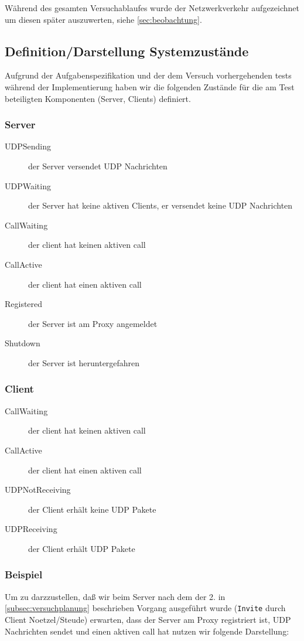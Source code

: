 \documentclass[10pt]{scrartcl}
\begin{document}
Während des gesamten Versuchablaufes wurde der Netzwerkverkehr aufgezeichnet um diesen später auszuwerten, siehe \ref{sec:beobachtung}.

\subsection{Definition/Darstellung Systemzustände}\label{subsec:systemzusatende}
Aufgrund der Aufgabenspezifikation und der dem Versuch vorhergehenden tests während der Implementierung haben wir die folgenden Zustände für die am Test beteiligten Komponenten (Server, Clients) definiert.


\subsubsection{Server}
	\begin{description}
		\item[UDPSending] der Server versendet UDP Nachrichten
		\item[UDPWaiting] der Server hat keine aktiven Clients, er versendet keine UDP Nachrichten
		\item[CallWaiting] der client hat keinen aktiven call
		\item[CallActive] der client hat einen aktiven call
		\item[Registered] der Server ist am Proxy angemeldet
		\item[Shutdown] der Server ist heruntergefahren
	\end{description}
	
\subsubsection{Client}	
	\begin{description}
		\item[CallWaiting] der client hat keinen aktiven call
		\item[CallActive] der client hat einen aktiven call
		\item[UDPNotReceiving] der Client erhält keine UDP Pakete
		\item[UDPReceiving] der Client erhält UDP Pakete
	\end{description}	
	

	

\subsubsection{Beispiel}
Um zu darzzustellen, daß wir beim Server nach dem der 2. in \ref{subsec:versuchplanung} beschrieben Vorgang ausgeführt wurde (\verb!Invite! durch Client Noetzel/Steude) erwarten, dass der Server am Proxy registriert ist, UDP Nachrichten sendet und einen aktiven call hat nutzen wir folgende Darstellung:
\end{document}
